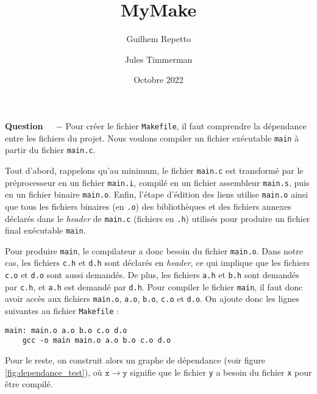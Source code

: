 \documentclass[11pt]{report}
\title{MyMake}
\date{Octobre 2022}
\author{Guilhem Repetto \and Jules Timmerman}
\newcounter{question}[section]
\newenvironment{question}[1][]{\refstepcounter{question}\par\medskip
   \noindent\textbf{Question~\thequestion ~ $-$} \rmfamily}{}
\begin{document}
\maketitle

\begin{abstract}

\end{abstract}




\begin{question}
Pour créer le fichier \texttt{Makefile}, il faut comprendre la dépendance entre les fichiers du projet.
Nous voulons compiler un fichier exécutable \texttt{main} à partir du fichier \texttt{main.c}.

Tout d'abord, rappelons qu'au minimum, le fichier \texttt{main.c} est transformé par le préprocesseur en un fichier \texttt{main.i}, compilé en un fichier assembleur \texttt{main.s}, puis en un fichier binaire \texttt{main.o}. Enfin, l'étape d'édition des liens utilise \texttt{main.o} ainsi que tous les fichiers binaires (en \texttt{.o}) des bibliothèques et des fichiers annexes déclarés dans le \textit{header} de \texttt{main.c} (fichiers en \texttt{.h}) utilisés pour produire un fichier final exécutable \texttt{main}.


Pour produire \texttt{main}, le compilateur a donc besoin du fichier \texttt{main.o}. Dans notre cas, les fichiers \texttt{c.h} et \texttt{d.h} sont déclarés en \textit{header}, ce qui implique que les fichiers \texttt{c.o} et \texttt{d.o} sont aussi demandés. De plus, les fichiers \texttt{a.h} et \texttt{b.h} sont demandés par \texttt{c.h}, et \texttt{a.h} est demandé par \texttt{d.h}. Pour compiler le fichier \texttt{main}, il faut donc avoir accès aux fichiers \texttt{main.o}, \texttt{a.o}, \texttt{b.o}, \texttt{c.o} et \texttt{d.o}.
On ajoute donc les lignes suivantes au fichier \texttt{Makefile} :
\begin{verbatim}
main: main.o a.o b.o c.o d.o
    gcc -o main main.o a.o b.o c.o d.o
\end{verbatim}

Pour le reste, on construit alors un graphe de dépendance (voir figure \ref{fig:dependance_test}), où $\mathtt{x}\rightarrow \mathtt{y}$ signifie que le fichier \texttt{y} a besoin du fichier \texttt{x} pour être compilé.



\end{question}
\end{document}

